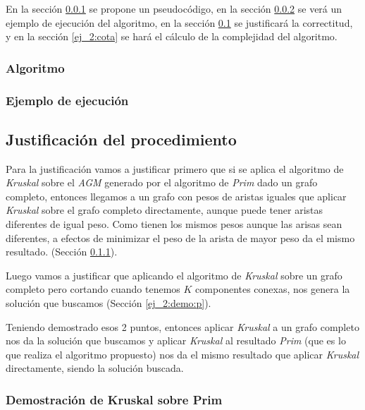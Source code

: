 En la secci\'on \ref{ej_2:algoritmo} se propone un pseudoc\'odigo, en la secci\'on \ref{ej_2:ejemplo} se ver\'a un ejemplo de ejecuci\'on del algoritmo,
en la secci\'on \ref{ej_2:justificacion} se justificar\'a la correctitud, y en la secci\'on \ref{ej_2:cota} se har\'a el c\'alculo de la complejidad del algoritmo.

\subsubsection{Algoritmo} \label{ej_2:algoritmo}



\subsubsection{Ejemplo de ejecuci\'on} \label{ej_2:ejemplo}

\subsection{Justificaci\'on del procedimiento} \label{ej_2:justificacion}

Para la justificaci\'on vamos a justificar primero que si se aplica el algoritmo de \emph{Kruskal} sobre el \emph{AGM} generado por el algoritmo de \emph{Prim} dado un grafo completo, entonces llegamos a un grafo con pesos de aristas iguales que aplicar \emph{Kruskal} sobre el grafo completo directamente, aunque puede tener aristas diferentes de igual peso. Como tienen los mismos pesos aunque las arisas sean diferentes, a efectos de minimizar el peso de la arista de mayor peso da el mismo resultado. (Secci\'on \ref{ej_2:demo:k}).

Luego vamos a justificar que aplicando el algoritmo de \emph{Kruskal} sobre un grafo completo pero cortando cuando tenemos $K$ componentes conexas, nos genera la soluci\'on que buscamos (Secci\'on \ref{ej_2:demo:p}).

Teniendo demostrado esos 2 puntos, entonces aplicar \emph{Kruskal} a un grafo completo nos da la soluci\'on que buscamos y aplicar \emph{Kruskal} al resultado \emph{Prim} (que es lo que realiza el algoritmo propuesto) nos da el mismo resultado que aplicar \emph{Kruskal} directamente, siendo la soluci\'on buscada.

\subsubsection{Demostraci\'on de Kruskal sobre Prim} \label{ej_2:demo:k}

